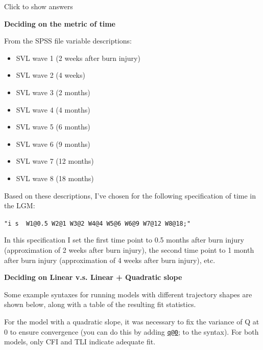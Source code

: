 \documentclass[
]{book}
\providecommand{\tightlist}{%
  \setlength{\itemsep}{0pt}\setlength{\parskip}{0pt}}
\begin{document}
Click to show answers

\textbf{Deciding on the metric of time }

From the SPSS file variable descriptions:

\begin{itemize}
\tightlist
\item
  SVL wave 1 (2 weeks after burn injury)
\item
  SVL wave 2 (4 weeks)
\item
  SVL wave 3 (2 months)
\item
  SVL wave 4 (4 months)
\item
  SVL wave 5 (6 months)
\item
  SVL wave 6 (9 months)
\item
  SVL wave 7 (12 months)
\item
  SVL wave 8 (18 months)
\end{itemize}

Based on these descriptions, I've chosen for the following specification of time in the LGM:

\texttt{"i\ s\ \textbar{}\ W1@0.5\ W2@1\ W3@2\ W4@4\ W5@6\ W6@9\ W7@12\ W8@18;"}

In this specification I set the first time point to 0.5 months after burn injury (approximation
of 2 weeks after burn injury), the second time point to 1 month after burn injury
(approximation of 4 weeks after burn injury), etc.

\textbf{Deciding on Linear v.s. Linear + Quadratic slope}

Some example syntaxes for running models with different trajectory shapes are shown below, along with a table of the resulting fit statistics.

For the model with a quadratic slope, it was necessary to fix the variance of Q at 0 to ensure convergence (you can do this by
adding \href{mailto:q@0}{\nolinkurl{q@0}}; to the syntax). For both models, only CFI and TLI indicate adequate fit.
\end{document}
